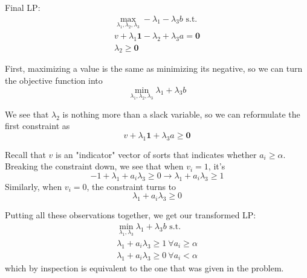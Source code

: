 \documentclass[12pt]{article}
\begin{document}
\begin{enumerate}
\begin{enumerate}
                        Final LP:
                        \begin{gather*}
                              \max_{\lambda_1, \lambda_2, \lambda_3} -\lambda_1-\lambda_3 b\text{ s.t.} \\
                              v + \lambda_1\mathbf{1} - \lambda_2+\lambda_3 a = \mathbf{0} \\
                              \lambda_2 \ge \mathbf{0}
                        \end{gather*}

                        First, maximizing a value is the same as minimizing its negative,
                        so we can turn the objective function into
                        \[\min_{\lambda_1, \lambda_2, \lambda_3} \lambda_1+\lambda_3 b\]

                        We see that $\lambda_2$ is nothing more than a slack variable, so we can reformulate the first constraint as
                        \[v + \lambda_1\mathbf{1} + \lambda_3 a \ge \mathbf{0}\]

                        Recall that $v$ is an "indicator" vector of sorts that indicates whether $a_i \ge \alpha$.
                        Breaking the constraint down, we see that when $v_i=1$, it's
                        \[-1+\lambda_1+a_i \lambda_3 \ge 0 \to \lambda_1+a_i \lambda_3 \ge 1\]
                        Similarly, when $v_i=0$, the constraint turns to
                        \[\lambda_1+a_i \lambda_3 \ge 0\]

                        Putting all these observations together, we get our transformed LP:
                        \begin{gather*}
                              \min_{\lambda_1, \lambda_3} \lambda_1+\lambda_3 b\text{ s.t.} \\
                              \lambda_1+a_i \lambda_3 \ge 1\ \forall a_i \ge \alpha \\
                              \lambda_1+a_i \lambda_3 \ge 0\ \forall a_i < \alpha
                        \end{gather*}
                        which by inspection is equivalent to the one that was given in the problem.
            \end{enumerate}

            \pagebreak


\end{enumerate}
\end{document}
